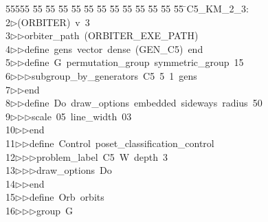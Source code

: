%
%
\begin{tabbing}
55555 \= 55 \= 55 \= 55 \= 55 \= 55 \= 55 \= 55 \= 55 \= 55 \= 55 \= 55 \= 55 \= \>C5\_KM\_2\_3:\\[0pt]
2\>$\triangleright$\>(ORBITER)\ v\ 3\ \\[0pt]
3\>$\triangleright$\>$\triangleright$\>orbiter\_path\ (ORBITER\_EXE\_PATH)\ \\[0pt]
4\>$\triangleright$\>$\triangleright$\>define\ gens\ vector\ dense\ (GEN\_C5)\ end\ \\[0pt]
5\>$\triangleright$\>$\triangleright$\>define\ G\ permutation\_group\ symmetric\_group\ 15\ \\[0pt]
6\>$\triangleright$\>$\triangleright$\>$\triangleright$\>subgroup\_by\_generators\ C5\ 5\ 1\ gens\ \\[0pt]
7\>$\triangleright$\>$\triangleright$\>end\ \\[0pt]
8\>$\triangleright$\>$\triangleright$\>define\ Do\ draw\_options\ embedded\ sideways\ radius\ 50\ \\[0pt]
9\>$\triangleright$\>$\triangleright$\>$\triangleright$\>scale\ 05\ line\_width\ 03\ \\[0pt]
10\>$\triangleright$\>$\triangleright$\>end\ \\[0pt]
11\>$\triangleright$\>$\triangleright$\>define\ Control\ poset\_classification\_control\ \\[0pt]
12\>$\triangleright$\>$\triangleright$\>$\triangleright$\>problem\_label\ C5\ W\ depth\ 3\ \\[0pt]
13\>$\triangleright$\>$\triangleright$\>$\triangleright$\>draw\_options\ Do\ \\[0pt]
14\>$\triangleright$\>$\triangleright$\>end\ \\[0pt]
15\>$\triangleright$\>$\triangleright$\>define\ Orb\ orbits\ \\[0pt]
16\>$\triangleright$\>$\triangleright$\>$\triangleright$\>group\ G\ \\[0pt]

\end{tabbing}
